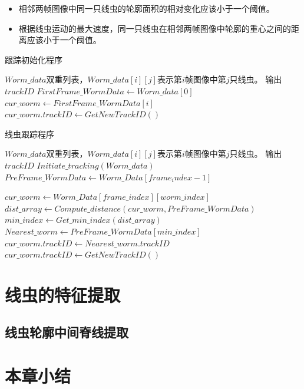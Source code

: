 	\begin{itemize}
	  \item 相邻两帧图像中同一只线虫的轮廓面积的相对变化应该小于一个阈值。
	  \item 根据线虫运动的最大速度，同一只线虫在相邻两帧图像中轮廓的重心之间的距离应该小于一个阈值。
	\end{itemize}

\begin{algorithm}
\caption{跟踪初始化程序}
\label{algo:initial_track}
\begin{algorithmic}[1]
	\Require $Worm\_data$双重列表，$Worm\_data[i][j]$表示第$i$帧图像中第$j$只线虫。
	\Ensure 输出$trackID$
		\State $FirstFrame\_WormData \gets Worm\_data[0]$
			\State $cur\_worm \gets FirstFrame\_WormData[i]$
			\State $cur\_worm.trackID \gets GetNewTrackID()$
		\EndFor
\EndFunction
\end{algorithmic}
\end{algorithm}

\begin{algorithm}[H]
\caption{线虫跟踪程序}
\label{algo:worm_track}
\begin{algorithmic}[1]
	\Require $Worm\_data$双重列表，$Worm\_data[i][j]$表示第$i$帧图像中第$j$只线虫。
	\Ensure 输出$trackID$
		\State $Initiate\_tracking(Worm\_data)$
			\State $PreFrame\_WormData \gets Worm\_Data[frame_index-1] $
\end{algorithmic}
\end{algorithm}
\begin{algorithm}[H]
\begin{algorithmic}[1]
		
				\State $cur\_worm \gets Worm\_Data[frame\_index][worm\_index]$
				\State $dist\_array \gets Compute\_distance(cur\_worm,PreFrame\_WormData)$
				\State $min\_index \gets Get\_min\_index(dist\_array)$
				\State $Nearest\_worm \gets PreFrame\_WormData[min\_index]$
					\State $cur\_worm.trackID \gets Nearest\_worm.trackID$
				\Else
					\State $cur\_worm.trackID \gets GetNewTrackID( )$
				\EndIf
			\EndFor
		\EndFor
\EndFunction
\end{algorithmic}
\end{algorithm}
\section{线虫的特征提取}
\subsection{线虫轮廓中间脊线提取}


\section{本章小结}


